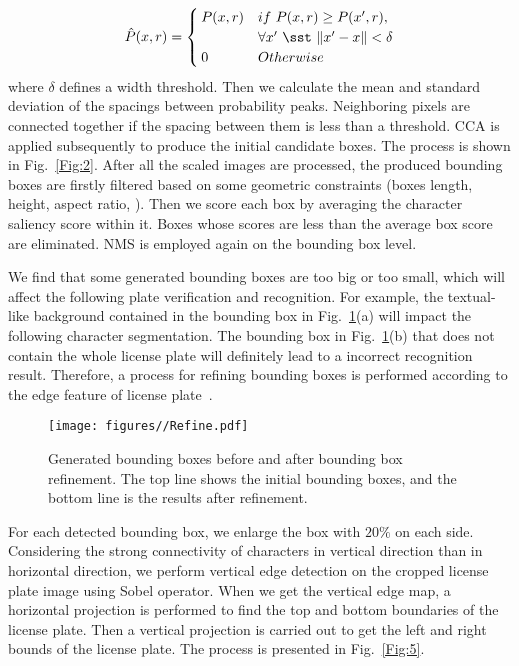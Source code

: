 \documentclass[twocolumn]{svjour3}
\begin{document}
\begin{equation}
\hat{P}(x,r) =
\begin{cases}
P(x,r) & if \,\, P(x,r) \ge P(x',r), \\
       & \forall x' \,\, \sst \,\, \|x' - x\| < \delta \\
0 & Otherwise
\end{cases}
\end{equation}
where $\delta$ defines a width threshold.
Then we calculate the mean and standard deviation of the spacings between probability peaks. Neighboring pixels are connected together if the spacing between them is less than a threshold. CCA is applied subsequently to produce the initial candidate boxes. The process is shown in Fig.~\ref{Fig:2}. %
After all the scaled images are processed, the produced bounding boxes are firstly filtered based on some geometric constraints (boxes length, height, aspect ratio, \etc). Then we score each box by averaging the character saliency score within it. Boxes whose scores are less than the average box score are eliminated. NMS is employed again on the bounding box level.
%

We find that some generated bounding boxes are too big or too small, which will affect the following plate verification and recognition. For example, the textual-like background contained in the bounding box in Fig.~\ref{Fig:41}(a) will impact the following character segmentation. The bounding box in Fig.~\ref{Fig:41}(b) that does not contain the whole license plate will definitely lead to a incorrect recognition result. Therefore, a process for refining bounding boxes is performed according to the edge feature of license plate~\cite{Zheng2013An}.

\begin{figure}[tb]
\centering
\texttt{[image: figures//Refine.pdf]}
\caption{Generated bounding boxes before and after bounding box refinement. The top line shows the initial bounding boxes, and the bottom line is the results after refinement. }
\label{Fig:41}
\end{figure}For each detected bounding box, we enlarge the box with $20\%$ on each side. Considering the strong connectivity of characters in vertical direction than in horizontal direction, we perform vertical edge detection on the cropped license plate image using Sobel operator. When we get the vertical edge map, a horizontal projection is performed to find the top and bottom boundaries of the license plate. Then a vertical projection is carried out to get the left and right bounds of the license plate. The process is presented in Fig.~\ref{Fig:5}.
\end{document}
